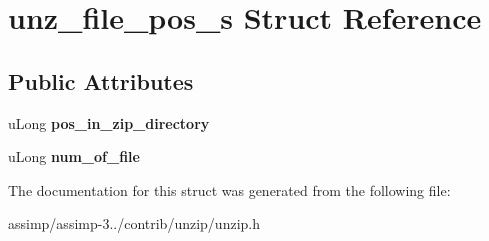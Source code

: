\hypertarget{structunz__file__pos__s}{\section{unz\+\_\+file\+\_\+pos\+\_\+s Struct Reference}
\label{structunz__file__pos__s}
}
\subsection*{Public Attributes}
\begin{DoxyCompactItemize}
\item 
\hypertarget{structunz__file__pos__s_a87d193346d3825363f899f574a2f3cb2}{u\+Long {\bfseries pos\+\_\+in\+\_\+zip\+\_\+directory}}\label{structunz__file__pos__s_a87d193346d3825363f899f574a2f3cb2}

\item 
\hypertarget{structunz__file__pos__s_a771dc0b7dba811b6174382f87f6800fc}{u\+Long {\bfseries num\+\_\+of\+\_\+file}}\label{structunz__file__pos__s_a771dc0b7dba811b6174382f87f6800fc}

\end{DoxyCompactItemize}


The documentation for this struct was generated from the following file\+:\begin{DoxyCompactItemize}
\item 
assimp/assimp-\/3../contrib/unzip/unzip.\+h\end{DoxyCompactItemize}
